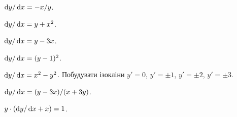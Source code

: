 \begin{problem}
	$\mathop{}\!\mathrm{d} y / \mathop{}\!\mathrm{d} x = - x / y$.
\end{problem}

\begin{problem}
	$\mathop{}\!\mathrm{d} y / \mathop{}\!\mathrm{d} x = y + x^2$.
\end{problem}

\begin{problem}
	$\mathop{}\!\mathrm{d} y / \mathop{}\!\mathrm{d} x = y - 3 x$.
\end{problem}

\begin{problem}
	$\mathop{}\!\mathrm{d} y / \mathop{}\!\mathrm{d} x = (y - 1)^2$.
\end{problem}

\begin{problem}
	$\mathop{}\!\mathrm{d} y / \mathop{}\!\mathrm{d} x = x^2 - y^2$. Побудувати ізокліни $y' = 0$, $y' = \pm 1$, $y' = \pm 2$, $y' = \pm 3$.
\end{problem}

\begin{problem}
	$\mathop{}\!\mathrm{d} y / \mathop{}\!\mathrm{d} x = (y - 3x) / (x + 3y)$.
\end{problem}

\begin{problem}
	$y \cdot (\mathop{}\!\mathrm{d} y / \mathop{}\!\mathrm{d} x + x) = 1$.
\end{problem}
